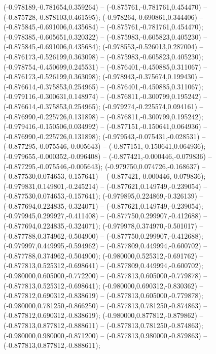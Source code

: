  (-0.978189,-0.781654,0.359264) -- (-0.875761,-0.781761,0.454470) -- (-0.875728,-0.878103,0.461595);
 (-0.978264,-0.690861,0.344406) -- (-0.875845,-0.691006,0.435684) -- (-0.875761,-0.781761,0.454470);
 (-0.978385,-0.605651,0.320322) -- (-0.875983,-0.605823,0.405230) -- (-0.875845,-0.691006,0.435684);
 (-0.978553,-0.526013,0.287004) -- (-0.876173,-0.526199,0.363098) -- (-0.875983,-0.605823,0.405230);
 (-0.978754,-0.450699,0.245531) -- (-0.876401,-0.450885,0.311067) -- (-0.876173,-0.526199,0.363098);
 (-0.978943,-0.375674,0.199430) -- (-0.876614,-0.375853,0.254965) -- (-0.876401,-0.450885,0.311067);
 (-0.979116,-0.300631,0.148974) -- (-0.876811,-0.300799,0.195242) -- (-0.876614,-0.375853,0.254965);
 (-0.979274,-0.225574,0.094161) -- (-0.876990,-0.225726,0.131898) -- (-0.876811,-0.300799,0.195242);
 (-0.979416,-0.150506,0.034992) -- (-0.877151,-0.150641,0.064936) -- (-0.876990,-0.225726,0.131898);
 (-0.979543,-0.075431,-0.028531) -- (-0.877295,-0.075546,-0.005643) -- (-0.877151,-0.150641,0.064936);
 (-0.979655,-0.000352,-0.096408) -- (-0.877421,-0.000446,-0.079836) -- (-0.877295,-0.075546,-0.005643);
 (-0.979750,0.074726,-0.168637) -- (-0.877530,0.074653,-0.157641) -- (-0.877421,-0.000446,-0.079836);
 (-0.979831,0.149801,-0.245214) -- (-0.877621,0.149749,-0.239054) -- (-0.877530,0.074653,-0.157641);
 (-0.979895,0.224869,-0.326139) -- (-0.877694,0.224835,-0.324071) -- (-0.877621,0.149749,-0.239054);
 (-0.979945,0.299927,-0.411408) -- (-0.877750,0.299907,-0.412688) -- (-0.877694,0.224835,-0.324071);
 (-0.979978,0.374970,-0.501017) -- (-0.877788,0.374962,-0.504900) -- (-0.877750,0.299907,-0.412688);
 (-0.979997,0.449995,-0.594962) -- (-0.877809,0.449994,-0.600702) -- (-0.877788,0.374962,-0.504900);
 (-0.980000,0.525312,-0.691762) -- (-0.877813,0.525312,-0.698641) -- (-0.877809,0.449994,-0.600702);
 (-0.980000,0.605000,-0.772200) -- (-0.877813,0.605000,-0.779878) -- (-0.877813,0.525312,-0.698641);
 (-0.980000,0.690312,-0.830362) -- (-0.877812,0.690312,-0.838619) -- (-0.877813,0.605000,-0.779878);
 (-0.980000,0.781250,-0.866250) -- (-0.877813,0.781250,-0.874863) -- (-0.877812,0.690312,-0.838619);
 (-0.980000,0.877812,-0.879862) -- (-0.877813,0.877812,-0.888611) -- (-0.877813,0.781250,-0.874863);
 (-0.980000,0.980000,-0.871200) -- (-0.877813,0.980000,-0.879863) -- (-0.877813,0.877812,-0.888611);
